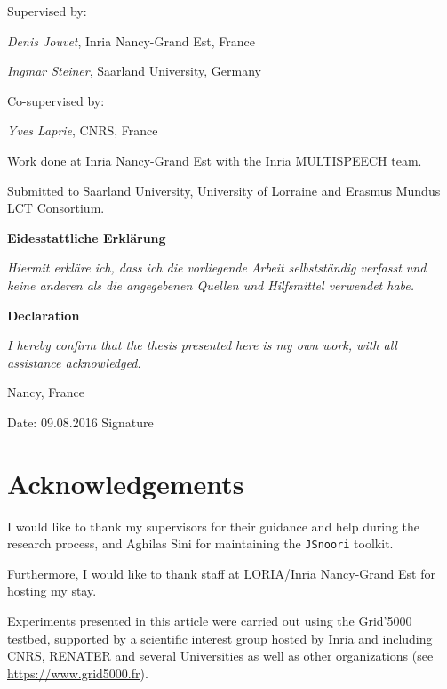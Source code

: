 \thispagestyle{empty}

Supervised by:

\textit{Denis Jouvet}, Inria Nancy-Grand Est, France

\textit{Ingmar Steiner}, Saarland University, Germany

\bigskip

Co-supervised by:

\textit{Yves Laprie}, CNRS, France

\bigskip

Work done at Inria Nancy-Grand Est with the Inria MULTISPEECH team.

\medskip

Submitted to Saarland University, University of Lorraine and Erasmus Mundus LCT Consortium.


\vfill

\noindent \textbf{Eidesstattliche Erklärung}

\smallskip

\textit{Hiermit erkläre ich, dass ich die vorliegende Arbeit selbstständig verfasst und keine anderen als die angegebenen Quellen und Hilfsmittel verwendet habe.}

\medskip

\noindent \textbf{Declaration}

\smallskip

\textit{I hereby confirm that the thesis presented here is my own work, with all assistance acknowledged.}

\bigskip

\noindent Nancy, France

\bigskip

\noindent Date: 09.08.2016 \hspace{3cm} Signature

\newpage

\thispagestyle{empty}

\section*{Acknowledgements}

I would like to thank my supervisors for their guidance and help during the research process, and Aghilas Sini for maintaining the \texttt{JSnoori} toolkit.

Furthermore, I would like to thank staff at LORIA/Inria Nancy-Grand Est for hosting my stay.

\bigskip

Experiments presented in this article were carried out using the
Grid'5000 testbed, supported by a scientific interest group hosted by
Inria and including CNRS, RENATER and several Universities as well as
other organizations (see \url{https://www.grid5000.fr}).
